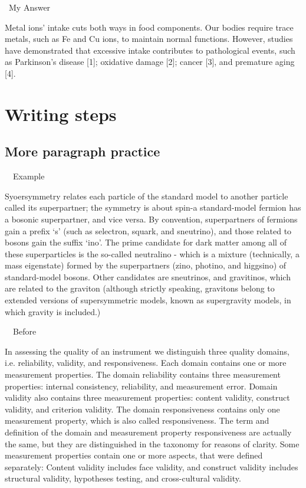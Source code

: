 \documentclass[a4paper, 12pt]{article}
\begin{document}
\par\textbullet\ My Answer

\par Metal ions' intake cuts both ways in food components. Our bodies require trace metals, such as Fe and Cu ions, to maintain normal functions.
However, studies have demonstrated that excessive intake contributes to pathological events,
such as Parkinson's disease [1]; oxidative damage [2]; cancer [3], and premature aging [4].

\newpage\section{Writing steps}

\subsection{More paragraph practice}

\par\ \textbullet\ Example
\par Syoersymmetry relates each particle of the standard model to another particle called its superpartner;
the symmetry is about spin-a standard-model fermion has a bosonic superpartner, and vice versa.
By convention, superpartners of fermions gain a prefix `s' (such as selectron, squark, and sneutrino), and those related to bosons gain the suffix `ino'.
The prime candidate for dark matter among all of these superparticles is the so-called neutralino - which is a mixture (technically, a mass eigenstate) formed by the superpartners (zino, photino, and higgsino) of standard-model bosons. Other candidates are sneutrinos, and gravitinos, which are related to the graviton (although strictly speaking, gravitons belong to extended versions of supersymmetric models, known as supergravity models, in which gravity is included.)

\par\ \textbullet\ Before
\par In assessing the quality of an instrument we distinguish three quality domains,
i.e. reliability, validity, and responsiveness. Each domain contains one or more measurement properties.
The domain reliability contains three measurement properties: internal consistency, reliability, and measurement error.
Domain validity also contains three measurement properties: content validity, construct validity, and criterion validity.
The domain responsiveness contains only one measurement property, which is also called responsiveness.
The term and definition of the domain and measurement property responsiveness are actually the same, but they are distinguished in the taxonomy for reasons of clarity.
Some measurement properties contain one or more aspects, that were defined separately: Content validity includes face validity,
and construct validity includes structural validity, hypotheses testing, and cross-cultural validity.
\end{document}
